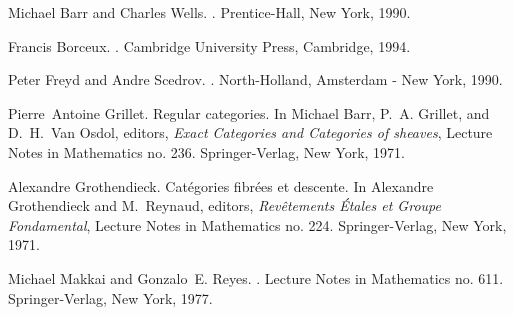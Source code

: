 \begin{thebibliography}{1}

Michael Barr and Charles Wells.
. \newblock Prentice-Hall, New York, 1990. 

Francis Borceux.
.
\newblock Cambridge University Press, Cambridge, 1994. 

Peter Freyd and Andre Scedrov.
.
\newblock North-Holland, Amsterdam - New York, 1990. 

Pierre~Antoine Grillet.
\newblock Regular categories.
\newblock In Michael Barr, P.~A. Grillet, and D.~H.~Van Osdol, editors, {\em 
Exact Categories and Categories of sheaves}, Lecture Notes in Mathematics no. 236. Springer-Verlag, New York, 1971.

Alexandre Grothendieck.
\newblock Cat\'{e}gories fibr\'{e}es et descente. \newblock In Alexandre Grothendieck and M.~Reynaud, editors, {\em 
Rev\^{e}tements \'{E}tales et Groupe Fondamental}, Lecture Notes in Mathematics no. 224. Springer-Verlag, New York, 1971. 

Michael Makkai and Gonzalo~E. Reyes.
. \newblock Lecture Notes in Mathematics no. 611. Springer-Verlag, New York, 
1977.

\end{thebibliography}